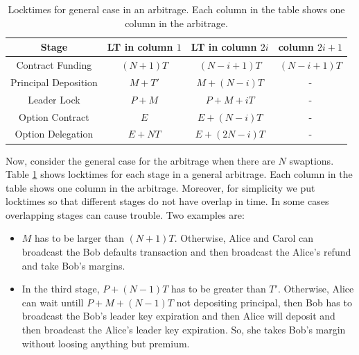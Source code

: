 \begin{table}[]
    \centering
    \begin{tabular}{|c|c|c|c|}
    \hline
        {\normalsize Stage} & {\normalsize LT in column $1$} & {\normalsize LT in column $2i$} & {\normalsize column $2i + 1$}\\
        \hline
        
        {\normalsize Contract Funding} &
        {\normalsize $(N + 1)T$} &
        {\normalsize $(N - i + 1)T$} &
        {\normalsize $(N - i + 1)T$} \\
        
        {\normalsize Principal Deposition} &
        {\normalsize $M + T'$} &
        {\normalsize $M + (N - i)T$} & - \\
        
        {\normalsize Leader Lock} & {\normalsize $P + M$} &
        {\normalsize $P + M + iT$} & - \\
        
        {\normalsize Option Contract} & 
        {\normalsize $E$} &
        {\normalsize $E + (N - i)T$} & - \\
        
        {\normalsize Option Delegation} & 
        {\normalsize $E + NT$} & 
        {\normalsize $E + (2N - i)T$} & - \\
        \hline
    \end{tabular}
    \caption{Locktimes for general case in an arbitrage. Each column in the table shows one column in the arbitrage.}
    \label{tab:arb}
\end{table}

Now, consider the general case for the arbitrage when there are $N$ swaptions.
Table \ref{tab:arb} shows locktimes for each stage in a general arbitrage. Each column in the table shows one column in the arbitrage. Moreover, for simplicity we put locktimes so that different stages do not have overlap in time. In some cases overlapping stages can cause trouble. Two examples are: 

\begin{itemize}
    \item $M$ has to be larger than $(N + 1)T$. Otherwise, Alice and Carol can broadcast the Bob defaults transaction and then broadcast the Alice's refund and take Bob's margins.
    
    \item In the third stage, $P + (N - 1)T$ has to be greater than $T'$. Otherwise, Alice can wait untill $P + M + (N - 1)T$ not depositing principal, then Bob has to broadcast the Bob's leader key expiration and then Alice will deposit and then broadcast the Alice's leader key expiration. So, she takes Bob's margin without loosing anything but premium.
\end{itemize}

